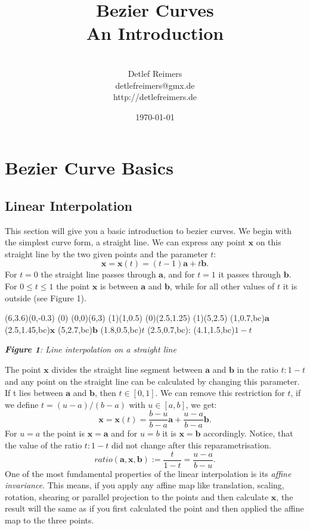 \documentclass[titlepage,a4paper,11pt]{report}
\title{
 \bf{\Huge Bezier Curves} \\ \vspace{0.6cm}
 \bf{An Introduction}}
\author{ \\
 Detlef Reimers\\
 detlefreimers@gmx.de\\
 http://detlefreimers.de}
\date{\today}
\def\it{\textit}
\def\bf{\textbf}
\def\mb{\mathbf}
\def\fr{\frac}
\begin{document}
\parindent0cm
\maketitle

\chapter{Bezier Curve Basics}
\section{Linear Interpolation}
This section will give you a basic introduction to bezier curves. We begin
with the simplest curve form, a straight line. We can express any point
$\mb{x}$ on this straight line by the two given points and the parameter $t$:
\begin{equation}
  \mb{x}=\mb{x}(t)=(t-1)\mb{a}+t\mb{b}.
\end{equation}
For $t=0$ the straight line passes through $\mb{a}$, and for $t=1$
it passes through $\mb{b}$. For $0\le t\le 1$ the point $\mb{x}$
is between $\mb{a}$ and $\mb{b}$, while for all other values of $t$
it is outside (see Figure 1).
\begin{center}
\begin{lapdf}(6,3.6)(0,-0.3)
  \Dash(0)
  \Red
  \Line(0,0)(6,3) \Stroke
  \Point(1)(1,0.5)
  \Point(0)(2.5,1.25)
  \Point(1)(5,2.5)
  \Text(1,0.7,bc){$\mb{a}$}
  \Text(2.5,1.45,bc){$\mb{x}$}
  \Text(5,2.7,bc){$\mb{b}$}
  \Text(1.8,0.5,bc){$t$}
  \Text(2.5,0.7,bc){:}
  \Text(4.1,1.5,bc){$1-t$}
\end{lapdf}

\it{\bf{Figure 1}: Line interpolation on a straight line}
\end{center}
The point $\mb{x}$ divides the straight line segment between $\mb{a}$
and $\mb{b}$ in the ratio $t:1-t$ and any point on the straight line can be
calculated by changing this parameter. If t lies between $\mb{a}$ and
$\mb{b}$, then $t\in [0,1]$. We can remove this restriction for $t$, if
we define $t=(u-a)/(b-a)$ with $u\in [a,b]$, we get:
\begin{equation}
  \mb{x}=\mb{x}(t)=\fr{b-u}{b-a}\mb{a}+\fr{u-a}{b-a}\mb{b}.
\end{equation}
For $u=a$ the point is $\mb{x}=\mb{a}$ and for $u=b$ it is $\mb{x}=\mb{b}$
accordingly. Notice, that the value of the ratio $t:1-t$ did not change
after this reparametrisation.
\begin{equation}
  ratio(\mb{a,x,b}):=\fr{t}{1-t}=\fr{u-a}{b-u}.
\end{equation}
One of the most fundamental properties of the linear interpolation is its
\it{affine invariance}. This means, if you apply any affine map like
translation, scaling, rotation, shearing or parallel projection to the
points and then calculate $\mb{x}$, the result will the same as if you first
calculated the point and then applied the affine map to the three points.
\end{document}
